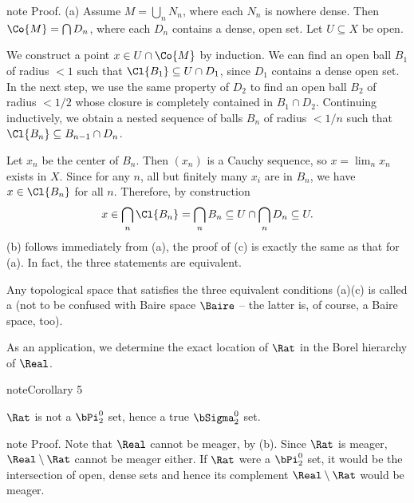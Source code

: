 \documentclass[letterpaper,10pt,english]{jupyterBook}
\begin{document}
\begin{sphinxadmonition}{note}
\sphinxAtStartPar
Proof. (a) Assume  \(M = \bigcup_n N_n\), where each \(N_n\) is nowhere dense. Then \(\Co{M} = \bigcap D_n\), where each \(D_n\) contains a dense, open set. Let \(U \subseteq X\) be open.

\sphinxAtStartPar
We construct a point \(x \in U \cap \Co{M}\) by induction. We can find an open ball \(B_1\) of radius \(<1\) such that \(\Cl{B_1} \subseteq U \cap D_1\), since \(D_1\) contains a dense open set. In the next step, we use the same property of \(D_2\) to find an open ball \(B_2\) of radius \(<1/2\) whose closure is completely contained in \(B_1 \cap D_2\).
Continuing inductively, we obtain a  nested sequence of balls \(B_n\) of radius \(<1/n\) such that \(\Cl{B_n} \subseteq B_{n-1} \cap D_n\).

\sphinxAtStartPar
Let \(x_n\) be the center of \(B_n\). Then \((x_n)\) is a Cauchy sequence, so \(x = \lim_n x_n\) exists in \(X\). Since for any \(n\), all but finitely many \(x_i\) are in \(B_n\), we have \(x \in \Cl{B_n}\) for all \(n\). Therefore, by construction
\begin{equation*}
\begin{split}
    x \in \bigcap_n \Cl{B_n} = \bigcap_n B_n \subseteq U \cap \bigcap_n D_n \subseteq U.
\end{split}
\end{equation*}
\sphinxAtStartPar
(b) follows immediately from (a), the proof of (c) is exactly the same as that for (a). In fact, the three statements are equivalent.
\end{sphinxadmonition}

\sphinxAtStartPar
Any topological space that satisfies the three equivalent conditions (a)\sphinxhyphen{}(c) is called a  (not to be confused with  Baire space \(\Baire\) – the latter is, of course, a Baire space, too).

\sphinxAtStartPar
As an application, we determine the exact location of \(\Rat\) in the Borel hierarchy of \(\Real\).
\label{measure:cor-rationals-not-pi2}
\begin{sphinxadmonition}{note}{Corollary 5}



\sphinxAtStartPar
\(\Rat\) is not a \(\bPi^0_2\) set, hence a true \(\bSigma^0_2\) set.
\end{sphinxadmonition}

\begin{sphinxadmonition}{note}
\sphinxAtStartPar
Proof. Note that \(\Real\) cannot be meager, by (b). Since \(\Rat\) is meager, \(\Real \setminus \Rat\) cannot be meager either.
If \(\Rat\) were a \(\bPi^0_2\) set, it would be the intersection of open, dense sets and hence its complement \(\Real \setminus \Rat\) would be meager.
\end{sphinxadmonition}
\end{document}
